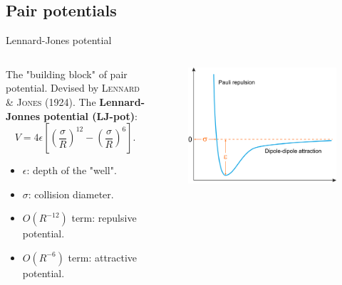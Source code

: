 \documentclass{beamer}
\begin{document}
\subsection{Pair potentials}
\begin{frame}{Lennard-Jones potential}
    \begin{columns}
        \begin{column}{0.6\textwidth}
            The "building block" of pair potential. Devised by \textsc{Lennard \& Jones} (1924). The \textbf{Lennard-Jonnes potential (LJ-pot)}:
            \begin{equation}
                V = 4\epsilon\left[\left(\frac{\sigma}{R}\right)^{12} - \left(\frac{\sigma}{R}\right)^{6} \right].
                \label{eq:lj}
            \end{equation}
            \begin{itemize}
                \item $\epsilon$: depth of the "well".
                \item $\sigma$: collision diameter.
                \item $O(R^{-12})$ term: repulsive potential.
                \item $O(R^{-6})$ term: attractive potential.
            \end{itemize}
        \end{column}
        \begin{column}{0.5\textwidth}
            \begin{figure}
                \centering
                \includegraphics[scale=0.55]{img/slide/lennard_jones_potential.png}
                \label{fig:ljpot}
            \end{figure}
        \end{column}
    \end{columns}
\end{frame}
\end{document}
